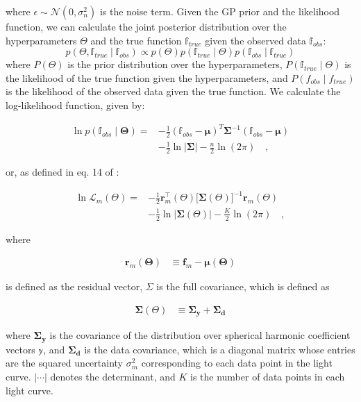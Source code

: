 \documentclass[twocolumn]{aastex631}
\begin{document}
where $\epsilon \sim \mathcal{N}(0, \sigma_n^2)$ is the noise term. Given the GP prior and the likelihood function, we can 
calculate the joint posterior distribution over the hyperparameters $\Theta$ and the true function $\mathbb{f}_{true}$ given the observed data $\mathbb{f}_{obs}$:
%
\begin{equation}
    p(\Theta, \mathbb{f}_{true} \mid \mathbb{f}_{obs}) \propto p(\Theta) p(\mathbb{f}_{true} \mid \Theta) p(\mathbb{f}_{obs} \mid \mathbb{f}_{true})
\end{equation}
%
where $P(\Theta)$ is the prior distribution over the hyperparameters, $P(\mathbb{f}_{true} \mid \Theta)$ is the likelihood of the true function given 
the hyperparameters, and $P(f_{obs} \mid f_{true})$ is the likelihood of the observed data given the true function.
We calculate the log-likelihood function, given by:
%
\begin{linenomath}\begin{align}
    \label{eq:log-likeSabina}
    \ln p(\mathbb{f}_{obs} \mid \pmb{\Theta}) 
    =
    & -\frac{1}{2} (\mathbb{f}_{obs} - \pmb{\mu})^T \pmb{\Sigma}^{-1} (\mathbb{f}_{obs} - \pmb{\mu}) 
    \nonumber       \\[0.75em]
    & -
    \frac{1}{2} \ln |\pmb{\Sigma}| - \frac{n}{2} \ln (2\pi)
    \quad,
\end{align}\end{linenomath}
%
or, as defined in eq. 14 of \citep{Luger2021}:
%
\begin{linenomath}\begin{align}
    \label{eq:log-likeRodrigo}
    \ln \mathcal{L}_m\left(\Theta\right)
    =
     & -\frac{1}{2}
    \mathbf{r}_m^\top\left(\Theta\right)
    \big[
        \pmb{\Sigma}\left(\Theta\right)
        \big]^{-1}
    \mathbf{r}_m\left(\Theta\right)
    \nonumber       \\[0.75em]
     & -
    \frac{1}{2}
    \ln \Big|
    \pmb{\Sigma}\left(\Theta\right)
    \Big|
    -
    \frac{K}{2}
    \ln \left( 2 \pi \right)
    \quad,
\end{align}\end{linenomath}
%
where
%
\begin{linenomath}\begin{align}
        \mathbf{r}_m\left(\pmb{\Theta}\right)
         & \equiv
        \mathbf{f}_m - \pmb{\mu}\left(\pmb{\Theta}\right)
    \end{align}\end{linenomath}
%
is defined as the residual vector,
%
$\Sigma$ is the full covariance, which is defined as 
%
\begin{linenomath}\begin{align}
    \pmb{\Sigma}\left(\Theta\right)
     & \equiv
    \pmb{\Sigma_y} + \pmb{\Sigma_d}
\end{align}\end{linenomath}
%
where $\pmb{\Sigma_y}$ is the covariance of the distribution over spherical harmonic coefficient
vectors $\mathbb{y}$, and $\pmb{\Sigma_d}$ is the data covariance, which is a diagonal
matrix whose entries are the squared uncertainty $\sigma_m^2$ corresponding to each data point in the light curve.
$| \cdots |$ denotes the determinant, and $K$ is the number of data points in
each light curve.%
\end{document}

